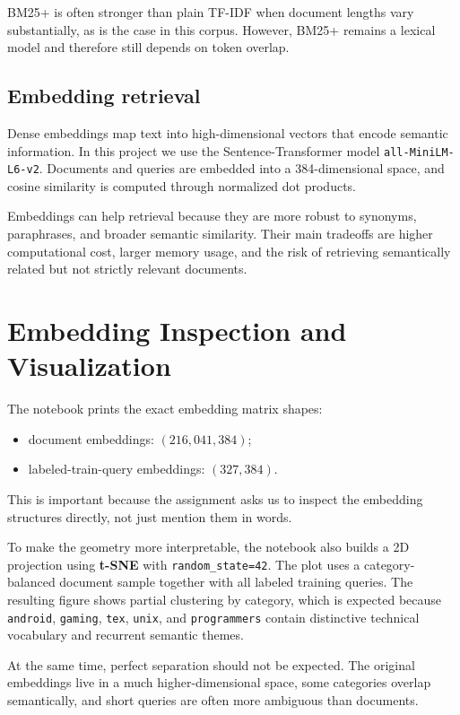 \documentclass[11pt,a4paper]{article}
\begin{document}
BM25+ is often stronger than plain TF-IDF when document lengths vary substantially, as is the case in this corpus. However, BM25+ remains a lexical model and therefore still depends on token overlap.

\subsection{Embedding retrieval}

Dense embeddings map text into high-dimensional vectors that encode semantic information. In this project we use the Sentence-Transformer model \texttt{all-MiniLM-L6-v2}. Documents and queries are embedded into a 384-dimensional space, and cosine similarity is computed through normalized dot products.

Embeddings can help retrieval because they are more robust to synonyms, paraphrases, and broader semantic similarity. Their main tradeoffs are higher computational cost, larger memory usage, and the risk of retrieving semantically related but not strictly relevant documents.

\section{Embedding Inspection and Visualization}

The notebook prints the exact embedding matrix shapes:
\begin{itemize}
    \item document embeddings: \((216{,}041, 384)\);
    \item labeled-train-query embeddings: \((327, 384)\).
\end{itemize}

This is important because the assignment asks us to inspect the embedding structures directly, not just mention them in words.

To make the geometry more interpretable, the notebook also builds a 2D projection using \textbf{t-SNE} with \texttt{random\_state=42}. The plot uses a category-balanced document sample together with all labeled training queries. The resulting figure shows partial clustering by category, which is expected because \texttt{android}, \texttt{gaming}, \texttt{tex}, \texttt{unix}, and \texttt{programmers} contain distinctive technical vocabulary and recurrent semantic themes.

At the same time, perfect separation should not be expected. The original embeddings live in a much higher-dimensional space, some categories overlap semantically, and short queries are often more ambiguous than documents.
\end{document}
